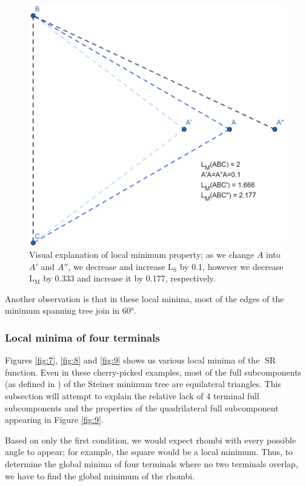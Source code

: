 \documentclass{mpaper}
\begin{document}
\begin{figure}[h!]
  \begin{center}
  \includegraphics[scale=1.3]{plot9.png}
  \end{center}
  \caption{\label{fig:10}Visual explanation of local minimum property; as we change $A$ into $A'$ and $A''$, we decrease and increase $\operatorname{L_S}$ by 0.1, however we decrease $\operatorname{L_M}$ by 0.333 and increase it by 0.177, respectively.}
\end{figure}

Another observation is that in these local minima, most of the edges of the minimum spanning tree join in 60°. 

\subsubsection{Local minima of four terminals}\label{sec:rhombus}
Figures \ref{fig:7}, \ref{fig:8} and \ref{fig:9} shows us various local minima of the $\operatorname{SR}$ function. Even in these cherry-picked examples, most of the full subcomponents (as defined in \cite{GP1968}) of the Steiner minimum tree are equilateral triangles. This subsection will attempt to explain the relative lack of 4 terminal full subcomponents and the properties of the  quadrilateral full subcomponent appearing in Figure \ref{fig:9}.

Based on only the first condition, we would expect rhombi with every possible angle to appear; for example, the square would be a local minimum. Thus, to determine the global minima of four terminals where no two terminals overlap, we have to find the global minimum of the rhombi.
\end{document}
